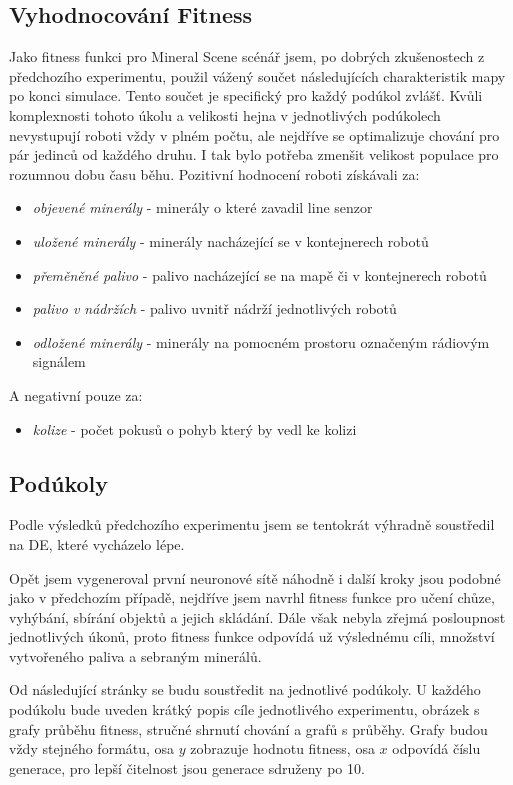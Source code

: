 \subsection*{Vyhodnocování Fitness}
Jako fitness funkci pro Mineral Scene scénář jsem, po dobrých zkušenostech z předchozího experimentu, použil vážený součet následujících charakteristik mapy po konci simulace. Tento součet je specifický pro každý podúkol zvlášť. Kvůli komplexnosti tohoto úkolu a velikosti hejna v jednotlivých podúkolech nevystupují roboti vždy v plném počtu, ale nejdříve se optimalizuje chování pro pár jedinců od každého druhu. I tak bylo potřeba zmenšit velikost populace pro rozumnou dobu času běhu. Pozitivní hodnocení roboti získávali za: 
\begin{itemize}
	\item \textit{objevené minerály} - minerály o které zavadil line senzor
	\item \textit{uložené minerály} - minerály nacházející se v kontejnerech robotů 
	\item \textit{přeměněné palivo} - palivo nacházející se na mapě či v kontejnerech robotů
	\item \textit{palivo v nádržích} - palivo uvnitř nádrží jednotlivých robotů
	\item \textit{odložené minerály} - minerály na pomocném prostoru označeným rádiovým signálem
\end{itemize}
A negativní pouze za: 
\begin{itemize}
	\item \textit{kolize} - počet pokusů o pohyb který by vedl ke kolizi
\end{itemize}
\subsection*{Podúkoly}
Podle výsledků předchozího experimentu jsem se tentokrát výhradně soustředil na DE, které vycházelo lépe.
\par 
Opět jsem vygeneroval první neuronové sítě náhodně i další kroky jsou podobné jako v předchozím případě, nejdříve jsem navrhl fitness funkce pro učení chůze, vyhýbání, sbírání objektů a jejich skládání. Dále však nebyla zřejmá posloupnost jednotlivých úkonů, proto fitness funkce odpovídá už výslednému cíli, množství vytvořeného paliva a sebraným minerálů.
\par 
Od následující stránky se budu soustředit na jednotlivé podúkoly. U každého podúkolu bude uveden krátký popis cíle jednotlivého experimentu, obrázek s grafy průběhu fitness, stručné shrnutí chování a grafů s průběhy. Grafy budou vždy stejného formátu,  osa $y$ zobrazuje hodnotu fitness, osa $x$ odpovídá číslu generace, pro lepší čitelnost jsou generace sdruženy po 10. 
\clearpage

